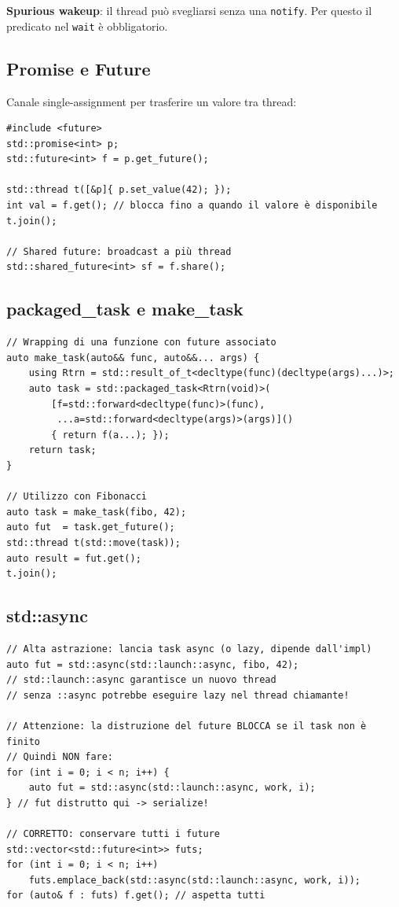 \documentclass[11pt,a4paper]{article}
\theoremstyle{remark}
\begin{document}
\textbf{Spurious wakeup}: il thread può svegliarsi senza una \texttt{notify}. Per questo il predicato nel \texttt{wait} è obbligatorio.

\subsection{Promise e Future}

Canale single-assignment per trasferire un valore tra thread:

\begin{lstlisting}
#include <future>
std::promise<int> p;
std::future<int> f = p.get_future();

std::thread t([&p]{ p.set_value(42); });
int val = f.get(); // blocca fino a quando il valore è disponibile
t.join();

// Shared future: broadcast a più thread
std::shared_future<int> sf = f.share();
\end{lstlisting}

\subsection{packaged\_task e make\_task}

\begin{lstlisting}
// Wrapping di una funzione con future associato
auto make_task(auto&& func, auto&&... args) {
    using Rtrn = std::result_of_t<decltype(func)(decltype(args)...)>;
    auto task = std::packaged_task<Rtrn(void)>(
        [f=std::forward<decltype(func)>(func),
         ...a=std::forward<decltype(args)>(args)]()
        { return f(a...); });
    return task;
}

// Utilizzo con Fibonacci
auto task = make_task(fibo, 42);
auto fut  = task.get_future();
std::thread t(std::move(task));
auto result = fut.get();
t.join();
\end{lstlisting}

\subsection{std::async}

\begin{lstlisting}
// Alta astrazione: lancia task async (o lazy, dipende dall'impl)
auto fut = std::async(std::launch::async, fibo, 42);
// std::launch::async garantisce un nuovo thread
// senza ::async potrebbe eseguire lazy nel thread chiamante!

// Attenzione: la distruzione del future BLOCCA se il task non è finito
// Quindi NON fare:
for (int i = 0; i < n; i++) {
    auto fut = std::async(std::launch::async, work, i);
} // fut distrutto qui -> serialize!

// CORRETTO: conservare tutti i future
std::vector<std::future<int>> futs;
for (int i = 0; i < n; i++)
    futs.emplace_back(std::async(std::launch::async, work, i));
for (auto& f : futs) f.get(); // aspetta tutti
\end{lstlisting}
\end{document}
